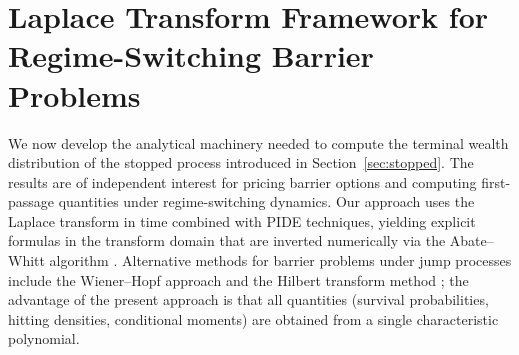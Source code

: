 \documentclass[11pt,a4paper]{article}
\numberwithin{equation}{section}
\begin{document}
\section{Laplace Transform Framework for Regime-Switching Barrier Problems}\label{sec:laplace}

We now develop the analytical machinery needed to compute the terminal wealth distribution of the stopped process introduced in Section~\ref{sec:stopped}. The results are of independent interest for pricing barrier options and computing first-passage quantities under regime-switching dynamics. Our approach uses the Laplace transform in time combined with PIDE techniques, yielding explicit formulas in the transform domain that are inverted numerically via the Abate--Whitt algorithm \citep{AbateWhitt1995}. Alternative methods for barrier problems under jump processes include the Wiener--Hopf approach \citep{KouWang2003, BoyarchenkoLevendorskii2012} and the Hilbert transform method \citep{FengLinetsky2008}; the advantage of the present approach is that all quantities (survival probabilities, hitting densities, conditional moments) are obtained from a single characteristic polynomial.
\end{document}
